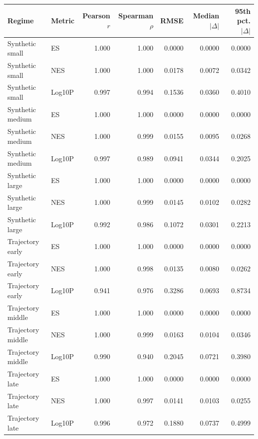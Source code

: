 \begin{tabular}{llrrrrr}
\toprule
Regime & Metric & Pearson $r$ & Spearman $\rho$ & RMSE & Median $|\Delta|$ & 95th pct. $|\Delta|$ \\
\midrule
Synthetic small & ES & 1.000 & 1.000 & 0.0000 & 0.0000 & 0.0000 \\
Synthetic small & NES & 1.000 & 1.000 & 0.0178 & 0.0072 & 0.0342 \\
Synthetic small & Log10P & 0.997 & 0.994 & 0.1536 & 0.0360 & 0.4010 \\
Synthetic medium & ES & 1.000 & 1.000 & 0.0000 & 0.0000 & 0.0000 \\
Synthetic medium & NES & 1.000 & 0.999 & 0.0155 & 0.0095 & 0.0268 \\
Synthetic medium & Log10P & 0.997 & 0.989 & 0.0941 & 0.0344 & 0.2025 \\
Synthetic large & ES & 1.000 & 1.000 & 0.0000 & 0.0000 & 0.0000 \\
Synthetic large & NES & 1.000 & 0.999 & 0.0145 & 0.0102 & 0.0282 \\
Synthetic large & Log10P & 0.992 & 0.986 & 0.1072 & 0.0301 & 0.2213 \\
Trajectory early & ES & 1.000 & 1.000 & 0.0000 & 0.0000 & 0.0000 \\
Trajectory early & NES & 1.000 & 0.998 & 0.0135 & 0.0080 & 0.0262 \\
Trajectory early & Log10P & 0.941 & 0.976 & 0.3286 & 0.0693 & 0.8734 \\
Trajectory middle & ES & 1.000 & 1.000 & 0.0000 & 0.0000 & 0.0000 \\
Trajectory middle & NES & 1.000 & 0.999 & 0.0163 & 0.0104 & 0.0346 \\
Trajectory middle & Log10P & 0.990 & 0.940 & 0.2045 & 0.0721 & 0.3980 \\
Trajectory late & ES & 1.000 & 1.000 & 0.0000 & 0.0000 & 0.0000 \\
Trajectory late & NES & 1.000 & 0.997 & 0.0141 & 0.0103 & 0.0255 \\
Trajectory late & Log10P & 0.996 & 0.972 & 0.1880 & 0.0737 & 0.4999 \\
\bottomrule
\end{tabular}
